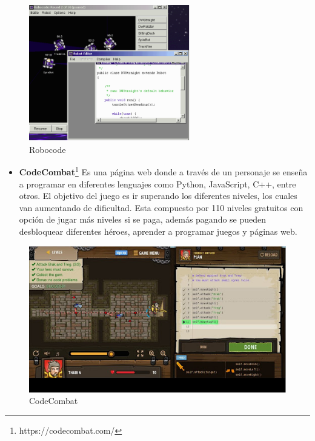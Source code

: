 \begin{figure}[H]
    \centering
    \includegraphics[width=7cm, keepaspectratio]{img/Robocode.png}
    \caption{Robocode}
    \label{fig:robocode}
\end{figure}

\begin{itemize}
\item \textbf{CodeCombat}\footnote{ https://codecombat.com/} Es una página web donde a través de un personaje se enseña a programar en diferentes lenguajes como Python, JavaScript, C++, entre otros. El objetivo del juego es ir superando los diferentes niveles, los cuales van aumentando de dificultad. Esta compuesto por 110 niveles gratuitos con opción de jugar más niveles si se paga, además pagando se pueden desbloquear diferentes héroes, aprender a programar juegos y páginas web\cite{app}.
\end{itemize}

\begin{figure}[H]
    \centering
    \includegraphics[width=13cm, keepaspectratio]{img/Codecombat.jpg}
    \caption{CodeCombat}
    \label{fig:codecombat}
\end{figure}

